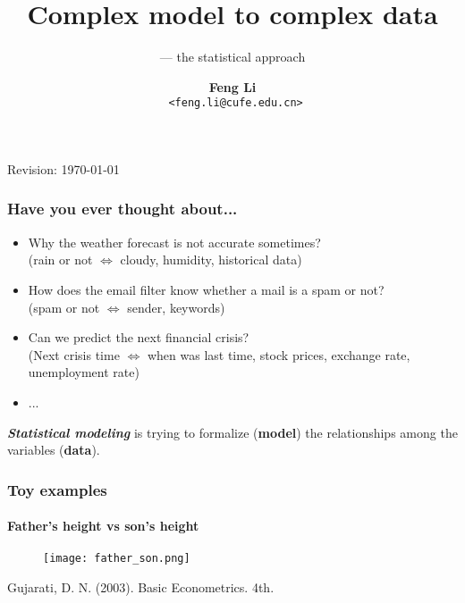 \documentclass[11pt]{beamer}
\title[Research Days 2013]{Complex model to complex data}
\subtitle{--- the statistical approach}
\author[Feng Li]{\textbf{Feng Li}\\\texttt{ <feng.li@cufe.edu.cn>}}
\institute[StatMath, CUFE]{\footnotesize{\textbf{School of Statistics and
      Mathematics\\ Central University of Finance and Economics}}}
\date{}
\begin{document}
\begin{frame}[plain]
    \titlepage
  \tiny{Revision: \today}
\end{frame}





\begin{frame}
\frametitle{Have you ever thought about...}

  \begin{itemize}
  \item Why the weather forecast is not accurate sometimes?\\
    (rain  or not $\Leftrightarrow$ cloudy, humidity, historical data)
  \item How does the email filter know whether a mail is a spam or not?\\
    (spam or not $\Leftrightarrow$ sender, keywords)
  \item Can we predict the next financial crisis?\\
    (Next crisis time $\Leftrightarrow$ when was last time, stock prices, exchange rate,
    unemployment rate)
  \item ...
  \end{itemize}
\vspace{1cm}
\emph{\textbf{Statistical modeling}} is trying to formalize (\textbf{model}) the relationships among the
variables (\textbf{data}).
\end{frame}


\begin{frame}
\frametitle{Toy examples}
\framesubtitle{Father's height vs son's height}
      \begin{figure}
        \centering
        \texttt{[image: father\_son.png]}
      \end{figure}
\tiny{Gujarati, D. N. (2003). Basic Econometrics. 4th.}
\end{frame}
\end{document}
